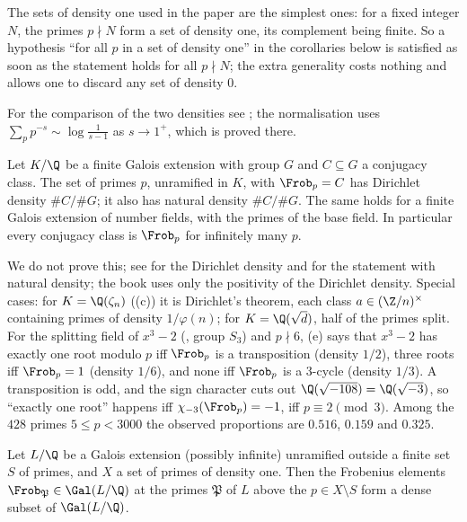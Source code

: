 The sets of density one used in the paper are the simplest ones: for a fixed integer $N$, the primes $p\nmid N$ form a set of density one, its complement being
finite. So a hypothesis ``for all $p$ in a set of density one'' in the corollaries below is satisfied as soon as the statement holds for all $p\nmid N$; the extra
generality costs nothing and allows one to discard any set of density $0$.

For the comparison of the two densities see \cite[Chapter VI, Section 4]{SerreCourse}; the normalisation uses $\sum_pp^{-s}\sim\log\frac1{s-1}$ as $s\to1^+$, which is
proved there.

\begin{theorem}\label{thm:galois:chebotarev}
Let $K/\Q$ be a finite Galois extension with group $G$ and $C\subseteq G$ a conjugacy class. The set of primes $p$, unramified in $K$, with $\Frob_p=C$ has Dirichlet
density $\#C/\#G$; it also has natural density $\#C/\#G$. The same holds for a finite Galois extension of number fields, with the primes of the base field. In particular
every conjugacy class is $\Frob_p$ for infinitely many $p$.
\end{theorem}

We do not prove this; see \cite[Chapter VII, Section 13]{Neukirch} for the Dirichlet density and \cite[Chapter I, Section 2.2]{SerreAbelian} for the statement with
natural density; the book uses only the positivity of the Dirichlet density. Special cases: for $K=\Q(\zeta_n)$ ((c)) it is Dirichlet's
theorem, each class $a\in(\Z/n)^\times$ containing primes of density $1/\varphi(n)$; for $K=\Q(\sqrt d)$, half of the primes split. For the splitting field of $x^3-2$
(, group $S_3$) and $p\nmid6$, (e) says that $x^3-2$ has exactly one root modulo $p$ iff $\Frob_p$ is a
transposition (density $1/2$), three roots iff $\Frob_p=1$ (density $1/6$), and none iff $\Frob_p$ is a $3$-cycle (density $1/3$). A transposition is odd, and the sign
character cuts out $\Q(\sqrt{-108})=\Q(\sqrt{-3})$, so ``exactly one root'' happens iff $\chi_{-3}(\Frob_p)=-1$, iff $p\equiv2\pmod3$. Among the $428$ primes $5\le p<3000$
the observed proportions are $0.516$, $0.159$ and $0.325$.

\begin{corollary}\label{cor:galois:chebotarev-dense}
Let $L/\Q$ be a Galois extension (possibly infinite) unramified outside a finite set $S$ of primes, and $X$ a set of primes of density one. Then the Frobenius elements
$\Frob_{\mathfrak P}\in\Gal(L/\Q)$ at the primes $\mathfrak P$ of $L$ above the $p\in X\setminus S$ form a dense subset of $\Gal(L/\Q)$.
\end{corollary}

